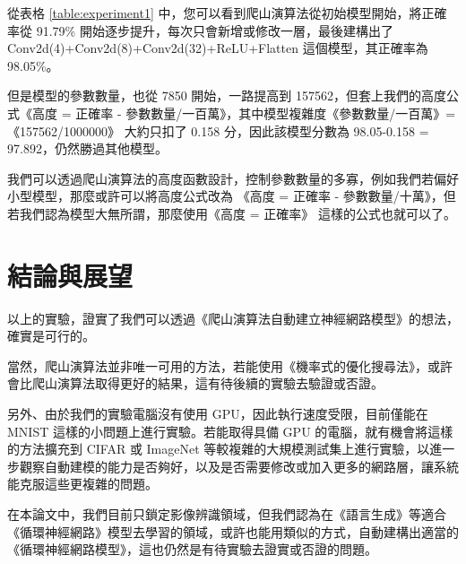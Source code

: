 \documentclass{article}
\begin{document}
從表格 \ref{table:experiment1} 中，您可以看到爬山演算法從初始模型開始，將正確率從 91.79\% 開始逐步提升，每次只會新增或修改一層，最後建構出了 Conv2d(4)+Conv2d(8)+Conv2d(32)+ReLU+Flatten 這個模型，其正確率為 98.05\%。

但是模型的參數數量，也從 7850 開始，一路提高到 157562，但套上我們的高度公式《高度 = 正確率 - 參數數量/一百萬》，其中模型複雜度《參數數量/一百萬》=《157562/1000000》 大約只扣了 0.158 分，因此該模型分數為 98.05-0.158 = 97.892，仍然勝過其他模型。

我們可以透過爬山演算法的高度函數設計，控制參數數量的多寡，例如我們若偏好小型模型，那麼或許可以將高度公式改為 《高度 = 正確率 - 參數數量/十萬》，但若我們認為模型大無所謂，那麼使用《高度 = 正確率》 這樣的公式也就可以了。

\section{結論與展望}

以上的實驗，證實了我們可以透過《爬山演算法自動建立神經網路模型》的想法，確實是可行的。

當然，爬山演算法並非唯一可用的方法，若能使用《機率式的優化搜尋法》，或許會比爬山演算法取得更好的結果，這有待後續的實驗去驗證或否證。

另外、由於我們的實驗電腦沒有使用 GPU，因此執行速度受限，目前僅能在 MNIST 這樣的小問題上進行實驗。若能取得具備 GPU 的電腦，就有機會將這樣的方法擴充到 CIFAR 或 ImageNet 等較複雜的大規模測試集上進行實驗，以進一步觀察自動建模的能力是否夠好，以及是否需要修改或加入更多的網路層，讓系統能克服這些更複雜的問題。

在本論文中，我們目前只鎖定影像辨識領域，但我們認為在《語言生成》等適合《循環神經網路》模型去學習的領域，或許也能用類似的方式，自動建構出適當的《循環神經網路模型》，這也仍然是有待實驗去證實或否證的問題。



\renewcommand\refname{參考文獻}

  


\end{document}
